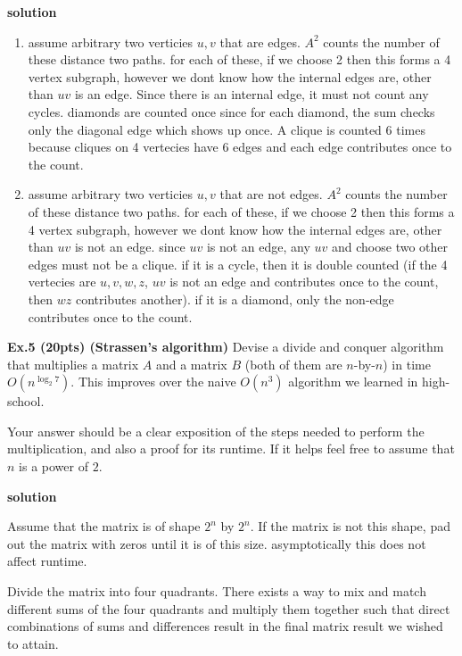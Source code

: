 \documentclass{article}
\newcommand{\sol}{\textbf{solution}}
\begin{document}
\sol 

\begin{enumerate}
    \item assume arbitrary two verticies \(u,v\) that are edges. \(A^2\) counts the number of these distance two paths. for each of these, if we choose 2 then this forms a 4 vertex subgraph, however we dont know how the internal edges are, other than \(uv\) is an edge. Since there is an internal edge, it must not count any cycles. diamonds are counted once since for each diamond, the sum checks only the diagonal edge which shows up once. A clique is counted 6 times because cliques on 4 vertecies have 6 edges and each edge contributes once to the count. 


    \item assume arbitrary two verticies \(u,v\) that are not edges. \(A^2\) counts the number of these distance two paths. for each of these, if we choose 2 then this forms a 4 vertex subgraph, however we dont know how the internal edges are, other than \(uv\) is not an edge. since \(uv\) is not an edge, any \(uv\) and choose two other edges must not be a clique. if it is a cycle, then it is double counted (if the 4 vertecies are \(u,v,w,z\), \(uv\) is not an edge and contributes once to the count, then \(wz\) contributes another). if it is a diamond, only the non-edge contributes once to the count. 
\end{enumerate}



\newpage
\noindent \textbf{Ex.5 (20pts) (Strassen's algorithm)}
Devise a divide and conquer algorithm that multiplies a matrix $A$ and a matrix $B$ (both of them are $n$-by-$n$) in time $O(n^{\log_2 7})$. This improves over the naive $O(n^3)$ algorithm we learned in high-school.

Your answer should be a clear exposition of the steps needed to perform the multiplication, and also a proof for its runtime. If it helps feel free to assume that $n$ is a power of $2$.

\sol 

Assume that the matrix is of shape \(2^n\) by \(2^n\). If the matrix is not this shape, pad out the matrix with zeros until it is of this size. asymptotically this does not affect runtime. 

Divide the matrix into four quadrants. There exists a way to mix and match different sums of the four quadrants and multiply them together such that direct combinations of sums and differences result in the final matrix result we wished to attain. 
\end{document}
